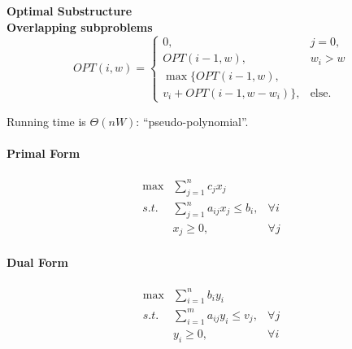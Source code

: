 \documentclass[a4paper]{article}
\begin{document}
\begin{multicols}{2}
\begin{tcolorbox}[title=Dynamic Programming]
    \textbf{Optimal Substructure}\\\textbf{Overlapping subproblems}
    \begin{equation*}
        OPT(i,w) = \begin{cases}
            0, & j = 0,\\
            OPT(i-1,w), & w_i>w\\
            \max\{OPT(i-1,w),\\v_i+OPT(i-1,w-w_i)\}, &\text{else}.
        \end{cases}
    \end{equation*}
    \begin{algorithm}[H]
        \caption{Knapsack Algorithm 
        }
        \;
    \end{algorithm}
    Running time is $\Theta(nW)$: ``pseudo-polynomial''.
\end{tcolorbox}

\begin{tcolorbox}[title=Linear Programming]
    \begin{multicols}{2}
        \paragraph{Primal Form}
        \begin{align*}
            \max& \sum_{j=1}^n c_jx_j \\
            s.t. & \sum_{j=1}^n a_{ij}x_j\leq b_i, &\forall i\\
                & x_j\geq 0,& \forall j
        \end{align*}
        \paragraph{Dual Form}
        \begin{align*}
            \max& \sum_{i=1}^n b_iy_i \\
            s.t. & \sum_{i=1}^m a_{ij}y_i\leq v_j, &\forall j\\
                & y_i\geq 0,& \forall i
        \end{align*}\par
    \end{multicols}

\end{tcolorbox}
\end{multicols}
\end{document}
